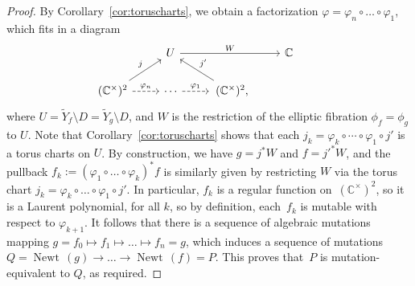 \documentclass[pdftex]{sigma}
\numberwithin{equation}{section}
\DeclareMathOperator{\Newt}{{Newt \,}}
\newcommand{\CC}{\mathbb{C}}
\begin{document}
\begin{proof}
By Corollary~\ref{cor:toruscharts}, we obtain a factorization $\varphi=\varphi_n \circ \dots \circ \varphi_1$, which fits in a diagram
	\[
	\begin{tikzcd}
		&U \ar[rr, "W"] && \CC &\\
		(\CC^\times)^2 \ar[ur, "j"]\ar[r, dashed, "\varphi_n"]&\cdots\ar[r, dashed, "\varphi_1"]&\, (\CC^\times)^2 \ar[ul, swap, "j'"],&
	\end{tikzcd}
	\]
	where $U=\tilde{Y}_f \setminus D=\tilde{Y}_g \setminus D$, and $W$ is the restriction of the elliptic fibration $\phi_f=\phi_g$ to $U$. Note that Corollary~\ref{cor:toruscharts} shows that each $j_k=
	\varphi_k \circ \cdots \circ \varphi_1 \circ j'$ is a torus charts on $U$.
	By construction, we have $g=j^*W$ and $f=j'^*W$, and the pullback $f_k:=(\varphi_{1} \circ \dots \circ \varphi_k)^*f$ is similarly given by restricting $W$ via the torus chart $j_k=
	\varphi_k \circ \dots \circ \varphi_1 \circ j'$.
	In particular, $f_k$ is a regular function on~$(\CC^\times)^2$, so it is a Laurent polynomial, for all $k$, so by definition, each~$f_k$ is mutable with respect to $\varphi_{k+1}$. It follows that there is a sequence of algebraic mutations mapping ${g=f_0 \mapsto f_1 \mapsto \dots \mapsto f_n=g}$, which induces a sequence of mutations ${Q=\Newt(g) \rightarrow \dots \rightarrow \Newt(f)=P}$. This proves that~$P$ is mutation-equivalent to $Q$, as required.
\end{proof}
\end{document}

